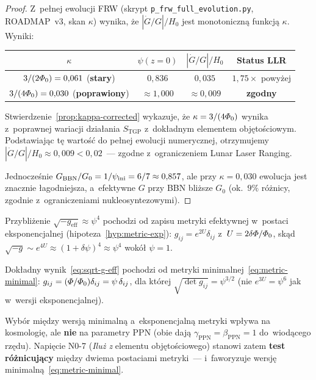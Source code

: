 \begin{proof}
Z~pe\l{}nej ewolucji FRW (skrypt \texttt{p\_frw\_full\_evolution.py},
ROADMAP~v3, skan $\kappa$) wynika, \.ze $|\dot{G}/G|/H_0$ jest
monotonicz\-n\k{a} funkcj\k{a} $\kappa$. Wyniki:
\begin{center}\small
\begin{tabular}{@{}cccc@{}}
\toprule
$\kappa$ & $\psi(z=0)$ & $|\dot{G}/G|/H_0$ & Status LLR \\
\midrule
$3/(2\varPhi_0) = 0{,}061$ (\textbf{stary}) & $0{,}836$ & $0{,}035$ &
  $1{,}75\times$ powy\.zej \\
$3/(4\varPhi_0) = 0{,}030$ (\textbf{poprawiony}) & $\approx 1{,}000$ &
  $\approx 0{,}009$ & \textbf{zgodny} \\
\bottomrule
\end{tabular}
\end{center}

Stwierdzenie~\ref{prop:kappa-corrected} wykazuje, \.ze
$\kappa = 3/(4\varPhi_0)$ wynika z~poprawnej wariacji dzia\l{}ania
$S_{\mathrm{TGP}}$ z~dok\l{}adnym elementem obj\k{e}to\'sciowym.
Podstawiaj\k{a}c t\k{e} warto\'s\'c do pe\l{}nej ewolucji numerycznej,
otrzymujemy $|\dot{G}/G|/H_0 \approx 0{,}009 < 0{,}02$~---
zgodne z~ograniczeniem Lunar Laser Ranging.

\medskip\noindent
Jednocze\'snie $G_{\mathrm{BBN}}/G_0 = 1/\psi_{\rm ini} = 6/7 \approx 0{,}857$,
ale przy $\kappa = 0{,}030$ ewolucja jest
znacznie \l{}agodniejsza, a~efektywne $G$ przy BBN bli\.zsze
$G_0$ (ok.\ $9\%$ r\'o\.znicy, zgodnie z~ograniczeniami
nukleosyntezowymi).
\end{proof}

\begin{remark}%
\label{rem:psi4-vs-psi}
Przybli\.zenie $\sqrt{-g_{\mathrm{eff}}} \approx \psi^4$ pochodzi
od zapisu metryki efektywnej w~postaci eksponencjalnej
(hipoteza~\ref{hyp:metric-exp}):
$g_{ij} = e^{2U}\delta_{ij}$ z~$U = 2\delta\varPhi/\varPhi_0$,
sk\k{a}d $\sqrt{-g} \sim e^{4U} \approx (1 + \delta\psi)^4
\approx \psi^4$ wok\'o\l{} $\psi = 1$.

Dok\l{}adny wynik~\eqref{eq:sqrt-g-eff} pochodzi od metryki
minimalnej~\eqref{eq:metric-minimal}:
$g_{ij} = (\varPhi/\varPhi_0)\delta_{ij} = \psi\,\delta_{ij}$,
dla kt\'orej $\sqrt{\det g_{ij}} = \psi^{3/2}$
(nie $e^{3U} = \psi^6$ jak w~wersji eksponencjalnej).

Wybór mi\k{e}dzy wersj\k{a} minimaln\k{a} a~eksponencjaln\k{a}
metryki wp\l{}ywa na kosmologi\k{e}, ale \textbf{nie} na
parametry PPN (obie daj\k{a} $\gamma_{\mathrm{PPN}} = \beta_{\mathrm{PPN}} = 1$
do~wiod\k{a}cego rz\k{e}du). Napi\k{e}cie N0-7 (\emph{Ilu\.z z}
elementu obj\k{e}to\'sciowego) stanowi zatem \textbf{test r\'o\.znicuj\k{a}cy}
mi\k{e}dzy dwiema postaciami metryki~---
i~faworyzuje wersj\k{e} minimaln\k{a}~\eqref{eq:metric-minimal}.
\end{remark}

